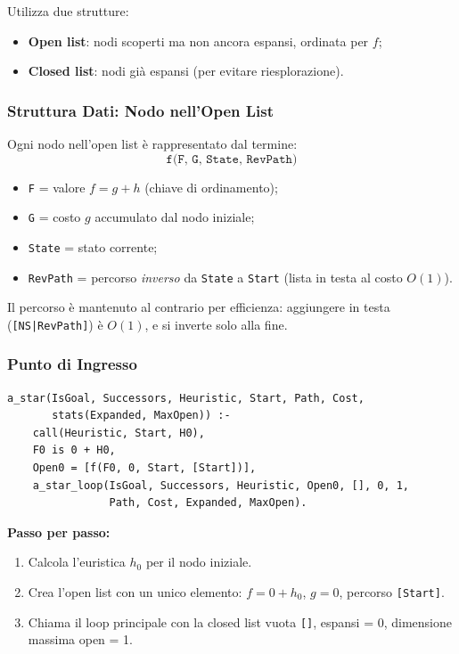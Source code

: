 \documentclass[12pt,a4paper]{article}
\begin{document}
Utilizza due strutture:
\begin{itemize}[noitemsep]
  \item \textbf{Open list}: nodi scoperti ma non ancora espansi, ordinata per $f$;
  \item \textbf{Closed list}: nodi già espansi (per evitare riesplorazione).
\end{itemize}

\subsubsection{Struttura Dati: Nodo nell'Open List}

Ogni nodo nell'open list è rappresentato dal termine:
\[
  \texttt{f(F, G, State, RevPath)}
\]
\begin{itemize}[noitemsep]
  \item \texttt{F} = valore $f = g + h$ (chiave di ordinamento);
  \item \texttt{G} = costo $g$ accumulato dal nodo iniziale;
  \item \texttt{State} = stato corrente;
  \item \texttt{RevPath} = percorso \emph{inverso} da \texttt{State} a \texttt{Start} (lista in testa al costo $O(1)$).
\end{itemize}

Il percorso è mantenuto al contrario per efficienza: aggiungere in testa
(\texttt{[NS|RevPath]}) è $O(1)$, e si inverte solo alla fine.

\subsubsection{Punto di Ingresso}

\begin{lstlisting}
a_star(IsGoal, Successors, Heuristic, Start, Path, Cost,
       stats(Expanded, MaxOpen)) :-
    call(Heuristic, Start, H0),
    F0 is 0 + H0,
    Open0 = [f(F0, 0, Start, [Start])],
    a_star_loop(IsGoal, Successors, Heuristic, Open0, [], 0, 1,
                Path, Cost, Expanded, MaxOpen).
\end{lstlisting}

\noindent\textbf{Passo per passo:}
\begin{enumerate}
  \item Calcola l'euristica $h_0$ per il nodo iniziale.
  \item Crea l'open list con un unico elemento: $f = 0 + h_0$, $g = 0$, percorso \texttt{[Start]}.
  \item Chiama il loop principale con la closed list vuota \texttt{[]},
        espansi = 0, dimensione massima open = 1.
\end{enumerate}
\end{document}
